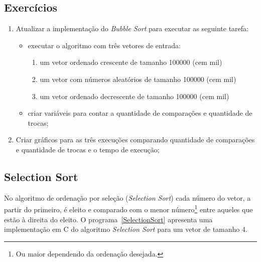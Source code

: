 \documentclass[11pt,fleqn]{book} %
\begin{document}
\subsection*{Exercícios}
\begin{enumerate}
	\item Atualizar a implementação do \textit{Bubble Sort} para executar as seguinte tarefa:
	\begin{itemize}
		\item executar o algoritmo com três vetores de entrada:
			\begin{enumerate}
				\item um vetor ordenado crescente de tamanho 100000 (cem mil)
				\item um vetor com números aleatórios de tamanho 100000 (cem mil)
				\item um vetor ordenado decrescente de tamanho 100000 (cem mil)
			\end{enumerate} 
		\item criar variáveis para contar a quantidade de comparações e quantidade de trocas;
	\end{itemize} 
	\item Criar gráficos para as três execuções comparando quantidade de comparações e quantidade de trocas e o tempo de execução;
\end{enumerate} 

\newpage
\subsection*{Selection Sort}
No algoritmo de ordenação por seleção (\textit{Selection Sort}) cada número do vetor, a partir do primeiro, é eleito e comparado com o menor número\footnote{Ou maior dependendo da ordenação desejada.} entre aqueles que estão à direita do eleito.
O  programa~\ref{SelectionSort} apresenta uma implementação em C do algoritmo \textit{Selection Sort} para um vetor de tamanho 4.
\label{SelectionSort}
\end{document}
